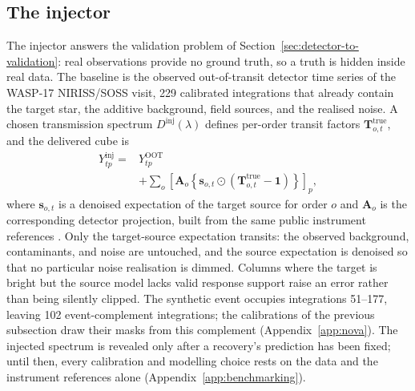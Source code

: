 \subsection{The injector}


The injector answers the validation problem of
Section~\ref{sec:detector-to-validation}: real observations provide no
ground truth, so a truth is hidden inside real data. The baseline is the
observed out-of-transit detector time series of the WASP-17 NIRISS/SOSS
visit, 229 calibrated integrations that already contain the target star,
the additive background, field sources, and the realised noise. A chosen
transmission spectrum $D^{\mathrm{inj}}(\lambda)$ defines per-order
transit factors $\bm{T}^{\mathrm{true}}_{o,t}$, and the delivered cube is
\begin{equation}
\begin{split}
 Y^{\mathrm{inj}}_{tp}
 = {}& Y^{\mathrm{OOT}}_{tp} \\
 & + \sum_{o}\left[\bm{A}_o\!\left\{\bm{s}_{o,t}\odot
   \left(\bm{T}^{\mathrm{true}}_{o,t}-\bm{1}\right)\right\}\right]_p ,
\end{split}
 \label{eq:v45-injector}
\end{equation}
where $\bm{s}_{o,t}$ is a denoised expectation of the target source for
order $o$ and $\bm{A}_o$ is the corresponding detector projection, built
from the same public instrument references
\citep{BainesEtAl2023Trace,BainesEtAl2023Wavelength,DarveauBernierEtAl2022}.
Only the target-source expectation transits: the observed background,
contaminants, and noise are untouched, and the source expectation is
denoised so that no particular noise realisation is dimmed. Columns where
the target is bright but the source model lacks valid response support
raise an error rather than being silently clipped. The synthetic event
occupies integrations 51--177, leaving 102 event-complement integrations;
the calibrations of the previous subsection draw their masks from this
complement (Appendix~\ref{app:nova}). The injected spectrum is revealed
only after a recovery's prediction has been fixed; until then, every
calibration and modelling choice rests on the data and the instrument
references alone (Appendix~\ref{app:benchmarking}).

